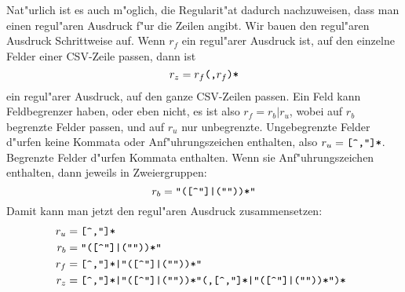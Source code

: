 \begin{loesung}
Nat"urlich ist es auch m"oglich, die Regularit"at dadurch nachzuweisen,
dass man einen regul"aren Ausdruck f"ur die Zeilen angibt. Wir bauen
den regul"aren Ausdruck Schrittweise auf. Wenn $r_f$ ein regul"arer Ausdruck
ist, auf den einzelne Felder einer CSV-Zeile passen, dann ist
\[
r_z=r_f\text{\tt (,}r_f\text{\tt )*}
\]
ein regul"arer Ausdruck, auf den ganze CSV-Zeilen passen. Ein Feld kann
Feldbegrenzer haben, oder eben nicht, es ist also $r_f=r_b|r_u$, wobei
auf $r_b$ begrenzte Felder passen, und auf $r_u$ nur unbegrenzte.
Ungebegrenzte Felder d"urfen keine Kommata oder Anf"uhrungszeichen
enthalten, also $r_u=\text{\tt [\char94,\char34]*}$. Begrenzte Felder
d"urfen Kommata enthalten. Wenn sie Anf"uhrungszeichen enthalten,
dann jeweils in Zweiergruppen:
\[
r_b=\text{\tt
\char34([\char94\char34]|(\char34\char34))*\char34
}
\]
Damit kann man jetzt den regul"aren Ausdruck zusammensetzen:
\begin{align*}
r_u&=\text{\tt
[\char94,\char34]*
}\\
r_b&=\text{\tt
\char34([\char94\char34]|(\char34\char34))*\char34
}\\
r_f&=\text{\tt
[\char94,\char34]*|\char34([\char94\char34]|(\char34\char34))*\char34
}\\
r_z&=\text{\tt
[\char94,\char34]*|\char34([\char94\char34]|(\char34\char34))*\char34
(,%
[\char94,\char34]*|\char34([\char94\char34]|(\char34\char34))*\char34
)*
}
\end{align*}
\end{loesung}
